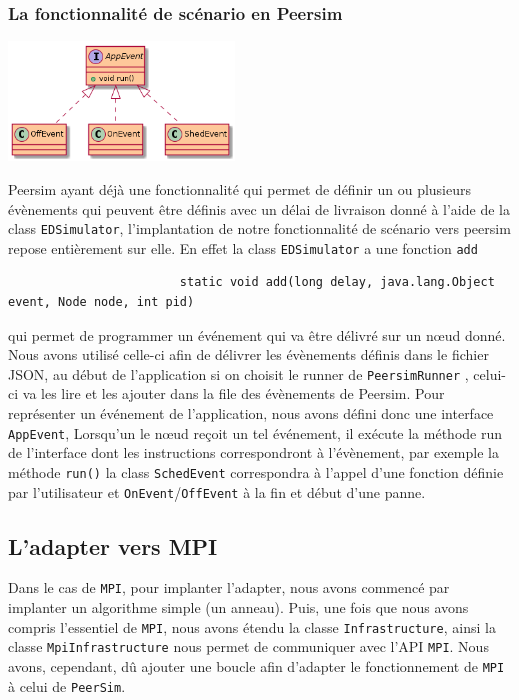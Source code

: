 \documentclass{article}
\begin{document}
						\subsubsection{La fonctionnalité de scénario en Peersim}
						\vspace{5mm}
						\hspace*{5cm} \includegraphics[width=60mm]{uml/scenPuml.png}
						
						\vspace{5mm}
						Peersim ayant déjà une fonctionnalité qui permet de définir un ou plusieurs évènements qui peuvent être définis avec un délai de livraison donné à l'aide de la class \verb|EDSimulator|,
						l'implantation de notre fonctionnalité de scénario vers peersim repose entièrement sur elle.
						En effet la class \verb|EDSimulator| a une fonction \verb|add|
						\begin{lstlisting}
						static void add(long delay, java.lang.Object event, Node node, int pid)
						\end{lstlisting}
						qui permet de programmer un événement qui va être délivré sur un nœud donné. 
						\newline
						Nous avons utilisé celle-ci afin de délivrer les évènements définis dans le fichier JSON, au début de l'application si on choisit le runner de \verb|PeersimRunner| , celui-ci va 
						les lire et les ajouter dans la file des évènements de Peersim.
		Pour représenter un événement de l'application, nous avons défini donc une interface \verb|AppEvent|,
						Lorsqu'un le nœud reçoit un tel événement, il exécute la méthode run de l'interface dont les instructions correspondront à l'évènement, par exemple la méthode \verb|run()| la class \verb|SchedEvent| 
						correspondra à l'appel d'une fonction définie par l'utilisateur et  \verb|OnEvent|/\verb|OffEvent| à la fin et début d'une panne.
			
			\newpage
			\subsection{L'adapter vers MPI}
			Dans le cas de \verb|MPI|, pour implanter l'adapter, nous avons commencé par implanter un algorithme simple (un anneau). Puis, une fois que nous avons compris l'essentiel de \verb|MPI|, nous avons étendu la classe \verb|Infrastructure|, ainsi la classe \verb|MpiInfrastructure| nous permet de communiquer avec l'API \verb|MPI|. 
			Nous avons, cependant, dû ajouter une boucle afin d'adapter le fonctionnement de \verb|MPI| à celui de \verb|PeerSim|.
\end{document}
